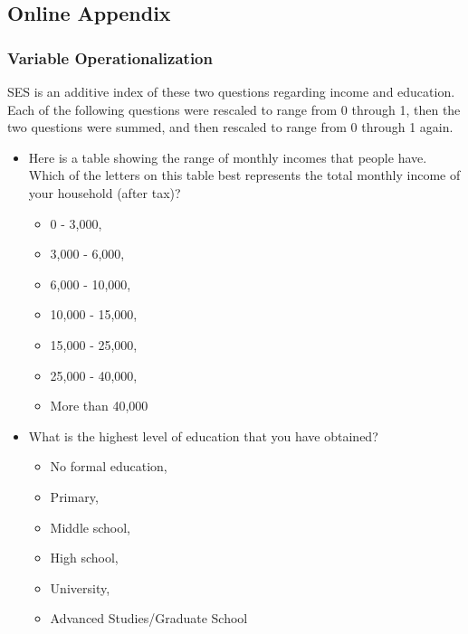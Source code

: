 \documentclass[]{interact}
\theoremstyle{plain}%
\theoremstyle{definition}
\theoremstyle{remark}
\begin{document}
\newpage{}

\hypertarget{online-appendix}{%
\subsection{Online Appendix}\label{online-appendix}}

\hypertarget{variable-operationalization}{%
\subsubsection{Variable
Operationalization}\label{variable-operationalization}}

SES is an additive index of these two questions regarding income and
education. Each of the following questions were rescaled to range from 0
through 1, then the two questions were summed, and then rescaled to
range from 0 through 1 again.

\begin{itemize}
\item
  Here is a table showing the range of monthly incomes that people have.
  Which of the letters on this table best represents the total monthly
  income of your household (after tax)?

  \begin{itemize}
  \item
    0 - 3,000,
  \item
    3,000 - 6,000,
  \item
    6,000 - 10,000,
  \item
    10,000 - 15,000,
  \item
    15,000 - 25,000,
  \item
    25,000 - 40,000,
  \item
    More than 40,000
  \end{itemize}
\item
  What is the highest level of education that you have obtained?

  \begin{itemize}
  \item
    No formal education,
  \item
    Primary,
  \item
    Middle school,
  \item
    High school,
  \item
    University,
  \item
    Advanced Studies/Graduate School
  \end{itemize}
\end{itemize}
\end{document}
